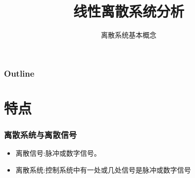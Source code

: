 \documentclass[table]{beamer}
\subtitle{离散系统基本概念}
\title{线性离散系统分析}
\author{}
\date{}
\begin{document}
\maketitle

\begin{frame}
\frametitle{Outline}
\setcounter{tocdepth}{3}
\tableofcontents
\end{frame}












\section{特点}
\label{sec-1}
\begin{frame}
\frametitle{离散系统与离散信号}
\label{sec-1-1}

\begin{itemize}
\item <2->离散信号:脉冲或数字信号。
\item <3->离散系统:控制系统中有一处或几处信号是脉冲或数字信号
\end{itemize}
\end{frame}
\end{document}
